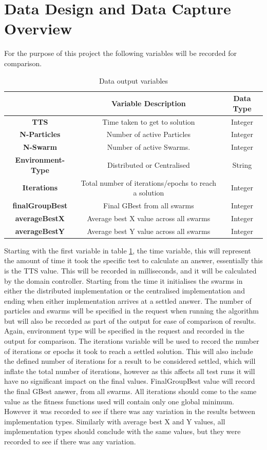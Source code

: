 \documentclass[oneside,12pt]{book}
\begin{document}
\section{Data Design and Data Capture Overview}
For the purpose of this project the following variables will be recorded for comparison. 
\begin{table}[H]
  \centering
    \begin{tabular}{| c | c | c |}
    \hline
     & \textbf{Variable Description} & \textbf{Data Type} \\ \hline
    \textbf{TTS} & Time taken to get to solution & Integer \\ \hline
    \textbf{N-Particles} & Number of active Particles  & Integer \\ \hline
    \textbf{N-Swarm} & Number of active Swarms. & Integer \\ \hline
    \textbf{Environment-Type} & Distributed or Centralised & String \\ \hline
    \textbf{Iterations} & Total number of iterations/epochs to reach a solution & Integer \\ \hline
    \textbf{finalGroupBest} & Final GBest from all swarms & Integer \\ \hline
    \textbf{averageBestX} & Average best X value across all swarms  & Integer \\ \hline
    \textbf{averageBestY} & Average best Y value across all swarms & Integer \\ \hline
    \end{tabular}
  \caption{Data output variables}
  \label{tab:data_output_design}
\end{table}
Starting with the first variable in table \ref{tab:data_output_design}, the time variable, this will represent the amount of time it took the specific test to calculate an answer, essentially this is the TTS value. This will be recorded in milliseconds, and it will be calculated by the domain controller. Starting from the time it initialises the swarms in either the distributed implementation or the centralised implementation and ending when either implementation arrives at a settled answer. The number of particles and swarms will be specified in the request when running the algorithm but will also be recorded as part of the output for ease of comparison of results. Again, environment type will be specified in the request and recorded in the output for comparison. The iterations variable will be used to record the number of iterations or epochs it took to reach a settled solution. This will also include the defined number of iterations for a result to be considered settled, which will inflate the total number of iterations, however as this affects all test runs it will have no significant impact on the final values. FinalGroupBest value will record the final GBest answer, from all swarms. All iterations should come to the same value as the fitness functions used will contain only one global minimum. However it was recorded to see if there was any variation in the results between implementation types. Similarly with average best X and Y values, all implementation types should conclude with the same values, but they were recorded to see if there was any variation.
\end{document}
